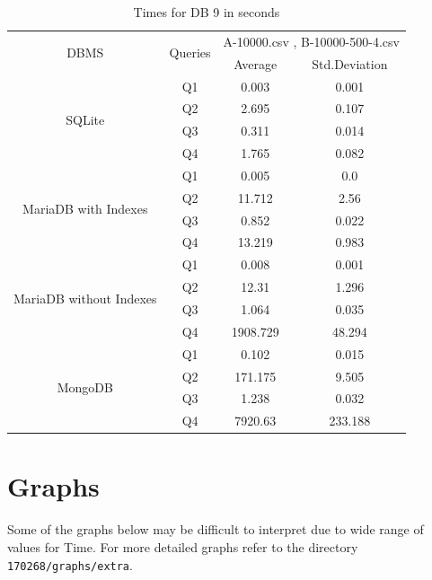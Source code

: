 \documentclass[12pt]{article}
\begin{document}
\begin{table}[H]
    \centering
\begin{tabular}{|c|c|c|c|}
    \hline
    \multirow{2}{*}{DBMS} & \multirow{2}{*}{Queries} & \multicolumn{2}{c|}{A-10000.csv , B-10000-500-4.csv}\\
    \cline{3-4}
     & & Average & Std.Deviation \\
    \hline
     \multirow{4}{*}{SQLite} & Q1 & 0.003 & 0.001 \\
\cline{2-4}
& Q2 & 2.695 & 0.107 \\
\cline{2-4}
& Q3 & 0.311 & 0.014 \\
\cline{2-4}
& Q4 & 1.765 & 0.082 \\
\cline{2-4}

     \hline
     \multirow{4}{*}{MariaDB with Indexes}
& Q1 & 0.005 & 0.0 \\
\cline{2-4}
& Q2 & 11.712 & 2.56 \\
\cline{2-4}
& Q3 & 0.852 & 0.022 \\
\cline{2-4}
& Q4 & 13.219 & 0.983 \\
\cline{2-4}
    \hline
    \multirow{4}{*}{MariaDB without Indexes} 
& Q1 & 0.008 & 0.001 \\
\cline{2-4}
& Q2 & 12.31 & 1.296 \\
\cline{2-4}
& Q3 & 1.064 & 0.035 \\
\cline{2-4}
& Q4 & 1908.729 & 48.294 \\
\cline{2-4}
    \hline
    \multirow{4}{*}{MongoDB} 
& Q1 & 0.102 & 0.015 \\
\cline{2-4}
& Q2 & 171.175 & 9.505 \\
\cline{2-4}
& Q3 & 1.238 & 0.032 \\
\cline{2-4}
& Q4 & 7920.63 & 233.188 \\
\cline{2-4}

    \hline
\end{tabular}

    \caption{Times for DB 9 in seconds}
    \label{tab:my_label}
\end{table}

\newpage

\section{Graphs}

Some of the graphs below may be difficult to interpret due to wide range of values for Time. For more detailed graphs refer to the directory \texttt{170268/graphs/extra}.
\end{document}
